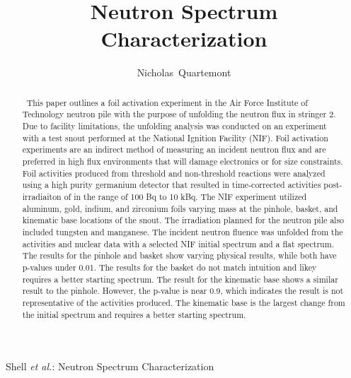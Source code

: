 \documentclass[journal]{IEEEtran}
\begin{document}
	\title{Neutron Spectrum Characterization}
	
	\author{Nicholas~Quartemont}
	
	{Shell \MakeLowercase{\textit{et al.}}: Neutron Spectrum Characterization }

	\maketitle
	
	\begin{abstract}
		\ This paper outlines a foil activation experiment in the Air Force Institute of Technology neutron pile with the purpose of unfolding the neutron flux in stringer 2. 
Due to facility limitations, the unfolding analysis was conducted on an experiment with a test snout performed at the National Ignition Facility (NIF). 
Foil activation experiments are an indirect method of measuring an incident neutron flux and are preferred in high flux environments that will damage electronics or for size constraints. 
Foil activities produced from threshold and non-threshold reactions were analyzed using a high purity germanium detector that resulted in time-corrected activities post-irradiaiton of in the range of 100 Bq to 10 kBq. 
The NIF experiment utilized aluminum, gold, indium, and zirconium foils varying mass at the pinhole, basket, and kinematic base locations of the snout. 
The irradiation planned for the neutron pile also included tungsten and manganese. 
The incident neutron fluence was unfolded from the activities and nuclear data with a selected NIF initial spectrum and a flat spectrum. 
The results for the pinhole and basket show varying physical results, while both have p-values under 0.01. 
The results for the basket do not match intuition and likey requires a better starting spectrum. 
The result for the kinematic base shows a similar result to the pinhole. 
However, the p-value is near 0.9, which indicates the result is not representative of the activities produced. 
The kinematic base is the largest change from the initial spectrum and requires a better starting spectrum. 
	\end{abstract}
	
\end{document}
